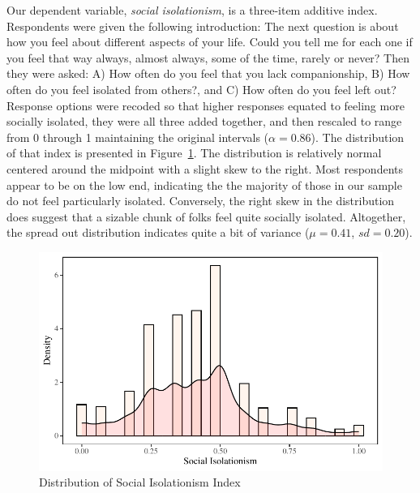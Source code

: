 \documentclass[
  letterpaper,
  DIV=11,
  numbers=noendperiod]{scrartcl}
\begin{document}
Our dependent variable, \emph{social isolationism}, is a three-item
additive index. Respondents were given the following introduction: The
next question is about how you feel about different aspects of your
life. Could you tell me for each one if you feel that way always, almost
always, some of the time, rarely or never? Then they were asked: A) How
often do you feel that you lack companionship, B) How often do you feel
isolated from others?, and C) How often do you feel left out? Response
options were recoded so that higher responses equated to feeling more
socially isolated, they were all three added together, and then rescaled
to range from 0 through 1 maintaining the original intervals
(\(\alpha = 0.86\)). The distribution of that index is presented in
Figure~\ref{fig-social-iso-dist}. The distribution is relatively normal
centered around the midpoint with a slight skew to the right. Most
respondents appear to be on the low end, indicating the the majority of
those in our sample do not feel particularly isolated. Conversely, the
right skew in the distribution does suggest that a sizable chunk of
folks feel quite socially isolated. Altogether, the spread out
distribution indicates quite a bit of variance (\(\mu = 0.41\),
\(sd = 0.20\)).

\begin{figure}

{\centering \includegraphics{Social-Isolation-in-China_files/figure-pdf/fig-social-iso-dist-1.pdf}

}

\caption{\label{fig-social-iso-dist}Distribution of Social Isolationism
Index}

\end{figure}
\end{document}
